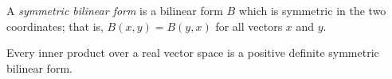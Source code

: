 \documentclass[12pt]{article}
\begin{document}
A {\em symmetric bilinear form} is a bilinear form $B$ which is symmetric in the two coordinates; that is, $B(x,y) = B(y,x)$ for all vectors $x$ and $y$.

Every inner product over a real vector space is a positive definite symmetric bilinear form.
\end{document}
